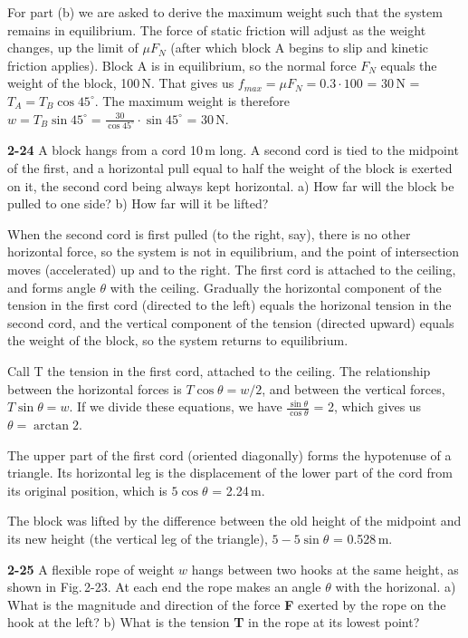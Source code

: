 \documentclass{amsart}
\begin{document}
For part (b) we are asked to derive the maximum weight such that the system remains in equilibrium.
The force of static friction will adjust as the weight changes, up the limit of $\mu F_N$
(after which block A begins to slip and kinetic friction applies).
Block A is in equilibrium,
so the normal force $F_N$ equals the weight of the block, 100\,N.
That gives us $f_{max} = \mu F_N = 0.3 \cdot 100$ = 30\,N = $T_A = T_B \cos 45^\circ$.
The maximum weight is therefore $w = T_B \sin 45^\circ = \frac{30}{\cos 45^\circ} \cdot \sin 45^\circ$ = 30\,N.

\vspace{\baselineskip}
\noindent
\textbf{2-24} A block hangs from a cord 10\,m long.
A second cord is tied to the midpoint of the first,
and a horizontal pull equal to half the weight of the block is exerted on it,
the second cord being always kept horizontal.\newline
a) How far will the block be pulled to one side?\newline
b) How far will it be lifted?

When the second cord is first pulled (to the right, say), there is no other horizontal force,
so the system is not in equilibrium, and the point of intersection moves (accelerated) up and to the right.
The first cord is attached to the ceiling, and forms angle $\theta$ with the ceiling.
Gradually the horizontal component of the tension in the first cord (directed to the left)
equals the horizonal tension in the second cord,
and the vertical component of the tension (directed upward)
equals the weight of the block,
so the system returns to equilibrium.

Call T the tension in the first cord, attached to the ceiling.
The relationship between the horizontal forces is $T \cos \theta = w/2$,
and between the vertical forces, $T \sin \theta = w$.
If we divide these equations, we have $\frac{\sin \theta}{\cos \theta}$ = 2,
which gives us $\theta = \arctan 2$.

The upper part of the first cord (oriented diagonally) forms the hypotenuse of a triangle.
Its horizontal leg is the displacement of the lower part of the cord from its original position,
which is $5 \cos \theta$ = 2.24\,m.

The block was lifted by the difference between the old height of the midpoint
and its new height (the vertical leg of the triangle),
$5 - 5 \sin \theta$ = 0.528\,m.

\vspace{\baselineskip}
\noindent
\textbf{2-25} A flexible rope of weight $w$ hangs between two hooks at the same height,
as shown in Fig.\,2-23.  
At each end the rope makes an angle $\theta$ with the horizonal.\newline
a) What is the magnitude and direction of the force \textbf{F} exerted by the rope
on the hook at the left?\newline
b) What is the tension \textbf{T} in the rope at its lowest point?
\end{document}
